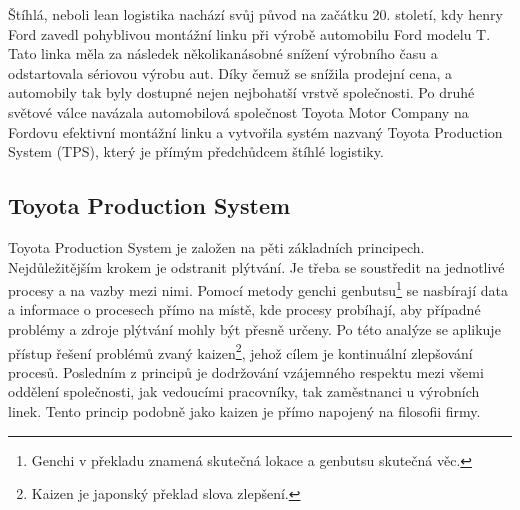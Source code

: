 Štíhlá, neboli lean logistika nachází svůj původ na začátku 20. století, kdy henry Ford zavedl pohyblivou montážní linku při výrobě automobilu Ford modelu T. Tato linka měla za následek několikanásobné snížení výrobního času a odstartovala sériovou výrobu aut. Díky čemuž se snížila prodejní cena, a  automobily tak byly dostupné nejen nejbohatší vrstvě společnosti. 
Po druhé světové válce navázala automobilová společnost Toyota Motor Company na Fordovu efektivní montážní linku a vytvořila systém nazvaný Toyota Production System (TPS), který je přímým předchůdcem štíhlé logistiky.\cite{bib:seven}

\subsection{Toyota Production System}

Toyota Production System je založen na pěti základních principech. Nejdůležitějším krokem je odstranit plýtvání. Je třeba se soustředit na jednotlivé procesy a na vazby mezi nimi. Pomocí metody genchi genbutsu\footnote{Genchi v překladu znamená skutečná lokace a genbutsu skutečná věc.} se nasbírají data a informace o procesech přímo na místě, kde procesy probíhají, aby případné problémy a zdroje plýtvání mohly být přesně určeny. Po této analýze se aplikuje přístup řešení problémů zvaný kaizen\footnote{Kaizen je japonský překlad slova zlepšení.}, jehož cílem je kontinuální zlepšování procesů. Posledním z principů je  dodržování vzájemného respektu mezi všemi oddělení společnosti, jak vedoucími pracovníky, tak zaměstnanci u výrobních linek. Tento princip podobně jako kaizen je přímo napojený na filosofii firmy.\cite{bib:seven}

